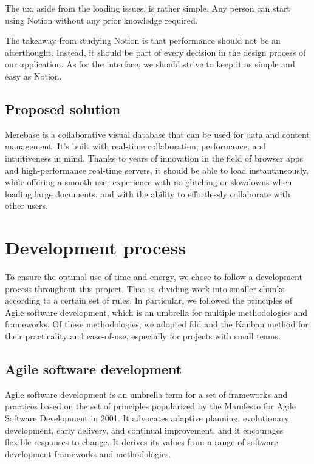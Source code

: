The \acrfull{ux}, aside from the loading issues, is rather simple.
Any person can start using Notion without any prior knowledge required.

The takeaway from studying Notion is that performance should not be an afterthought.
Instead, it should be part of every decision in the design process of our application.
As for the interface, we should strive to keep it as simple and easy as Notion.

\subsection{Proposed solution}

Merebase is a collaborative visual database that can be used for data
and content management. It's built with real-time collaboration,
performance, and intuitiveness in mind. Thanks to years of innovation in
the field of browser apps and high-performance real-time servers, it
should be able to load instantaneously, while offering a smooth user
experience with no glitching or slowdowns when loading large documents,
and with the ability to effortlessly collaborate with other users.

\section{Development process}

To ensure the optimal use of time and energy, we chose to follow a development process throughout this project.
That is, dividing work into smaller chunks according to a certain set of rules. In particular, we followed the principles of Agile software development, which is an umbrella for multiple methodologies and frameworks.
Of these methodologies, we adopted \acrfull{fdd} and the Kanban method for their practicality and ease-of-use, especially for projects with small teams.

\subsection{Agile software development}

Agile software development is an umbrella term for a set of frameworks and practices based on the set of principles popularized by the Manifesto for Agile Software Development in 2001.
It advocates adaptive planning, evolutionary development, early delivery, and continual improvement, and it encourages flexible responses to change.
It derives its values from a range of software development frameworks and methodologies.

